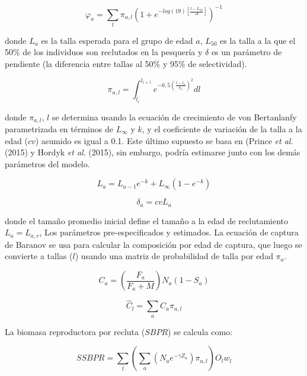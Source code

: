 \documentclass[
  spanish,
]{article}
\begin{document}
\begin{equation}
\varphi_a=\sum_{l}\pi_{a,l}\left(1+e^{-log(19) \left[\frac{l-L_{50}}{\Delta}\right]}\right)^{-1}
\end{equation}

donde \(L_a\) es la talla esperada para el grupo de edad \(a\), \(L_50\)
es la talla a la que el 50\% de los individuos son reclutados en la
pesquería y \(\delta\) es un parámetro de pendiente (la diferencia entre
tallas al 50\% y 95\% de selectividad).

\begin{equation}
\pi_{a,l}=\int_{l_i}^{l_{i+1}}e^{-0,5\left(\frac{l-l_a}{\delta_a}\right)^2}dl
\end{equation}

donde \(\pi_{a,l}\), \(l\) se determina usando la ecuación de
crecimiento de von Bertanlanfy parametrizada en términos de \(L_\infty\)
y \(k\), y el coeficiente de variación de la talla a la edad (\(cv\))
asumido es igual a 0.1. Este último supuesto se basa en (Prince \emph{et
al}. (2015) y Hordyk \emph{et al}. (2015), sin embargo, podría estimarse
junto con los demás parámetros del modelo.

\begin{equation}
L_a=L_{a-1}e^{-k}+L_\infty\left(1-e^{-k}\right)
\end{equation}

\begin{equation}
\delta_a = cv L_a
\end{equation}

donde el tamaño promedio inicial define el tamaño a la edad de
reclutamiento \(L_a = L_{a,r}\), Los parámetros pre-especificados y
estimados. La ecuación de captura de Baranov se usa para calcular la
composición por edad de captura, que luego se convierte a tallas (\(l\))
usando una matriz de probabilidad de talla por edad \(\pi_a\).

\begin{equation}
C_a=\left(\frac{F_a}{F_a+M}\right)N_a\left(1-S_a\right)
\end{equation}

\begin{equation}
\hat{C}_l=\sum_{a}C_a\pi_{a,l}
\end{equation}

La biomasa reproductora por recluta (\(SBPR\)) se calcula como:

\begin{equation}
SSBPR=\sum_{l}\left(\sum_{a}\left(N_a e^{-\gamma Z_a}\right)\pi_{a,l}\right)O_lw_l
\end{equation}
\end{document}
